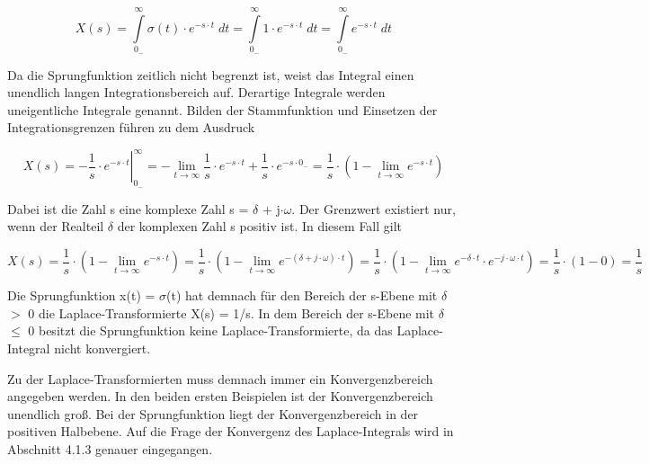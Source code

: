 \begin{equation}\label{eq:fourthirteen}
X\left(s\right)=\int\limits _{0_{-} }^{\infty }\sigma \left(t\right)\cdot e^{-s\cdot t} \;dt=\int\limits _{0_{-} }^{\infty }1\cdot e^{-s\cdot t} \;dt=\int\limits _{0_{-} }^{\infty }e^{-s\cdot t}\; dt
\end{equation}

\noindent Da die Sprungfunktion zeitlich nicht begrenzt ist, weist das Integral einen unendlich langen Integrationsbereich auf. Derartige Integrale werden uneigentliche Integrale genannt. Bilden der Stammfunktion und Einsetzen der Integrationsgrenzen führen zu dem Ausdruck

\begin{equation}\label{eq:fourfourteen}
X\left(s\right)=\left. -\frac{1}{s} \cdot e^{-s\cdot t} \right|_{0_{-} }^{\infty } =-\lim \limits_{t\to \infty } \frac{1}{s} \cdot e^{-s\cdot t} +\frac{1}{s} \cdot e^{-s\cdot 0_{-} } =\frac{1}{s} \cdot \left(1-\lim \limits_{t\to \infty } e^{-s\cdot t} \right)
\end{equation}

\noindent Dabei ist die Zahl s eine komplexe Zahl s = $\delta$ + j$\cdot\omega$. Der Grenzwert existiert nur, wenn der Realteil $\delta$ der komplexen Zahl s positiv ist. In diesem Fall gilt

\begin{equation}\label{eq:fourfifteen}
X\left(s\right)=\frac{1}{s} \cdot \left(1-\lim\limits_{t\to \infty} e^{-s\cdot t} \right)=\frac{1}{s} \cdot \left(1-\lim\limits_{t\to \infty } e^{-\left(\delta +j\cdot \omega \right)\cdot t} \right)=\frac{1}{s} \cdot \left(1-\lim\limits_{t\to \infty } e^{-\delta \cdot t} \cdot e^{-j\cdot \omega \cdot t} \right)=\frac{1}{s} \cdot \left(1-0\right)=\frac{1}{s}
\end{equation}

\noindent Die Sprungfunktion x(t) = $\sigma$(t) hat demnach für den Bereich der s-Ebene mit $\delta$ $\mathrm{>}$ 0 die Laplace-Transformierte X(s) = 1/s. In dem Bereich der s-Ebene mit $\delta$ $\leq$ 0 besitzt die Sprungfunktion keine Laplace-Transformierte, da das Laplace-Integral nicht konvergiert.\medskip

\noindent Zu der Laplace-Transformierten muss demnach immer ein Konvergenzbereich angegeben werden. In den beiden ersten Beispielen ist der Konvergenzbereich unendlich gro{\ss}. Bei der Sprungfunktion liegt der Konvergenzbereich in der positiven Halbebene. Auf die Frage der Konvergenz des Laplace-Integrals wird in Abschnitt 4.1.3 genauer eingegangen.\bigskip

